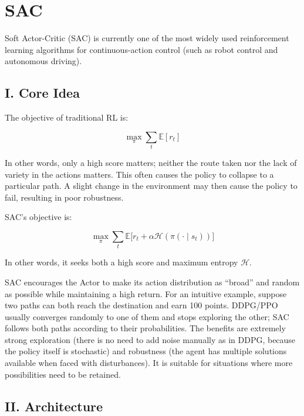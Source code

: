 \setcounter{section}{5}

\hypertarget{sac}{%
\section{SAC}\label{sac}}

Soft Actor-Critic (SAC) is currently one of the most widely used reinforcement learning algorithms for continuous-action control (such as robot control and autonomous driving).

\hypertarget{i.-core-idea-4}{%
\subsection{I. Core Idea}\label{i.-core-idea-4}}

The objective of traditional RL is:

\[
\max_\pi
\sum_t
\mathbb{E}[r_t]
\]

In other words, only a high score matters; neither the route taken nor the lack of variety in the actions matters. This often causes the policy to collapse to a particular path. A slight change in the environment may then cause the policy to fail, resulting in poor robustness.

SAC's objective is:

\[
\max_\pi
\sum_t
\mathbb{E}
\bigl[
r_t+\alpha\mathcal{H}(\pi(\cdot\mid s_t))
\bigr]
\]

In other words, it seeks both a high score and maximum entropy \(\mathcal{H}\).

SAC encourages the Actor to make its action distribution as ``broad'' and random as possible while maintaining a high return. For an intuitive example, suppose two paths can both reach the destination and earn 100 points. DDPG/PPO usually converges randomly to one of them and stops exploring the other; SAC follows both paths according to their probabilities. The benefits are extremely strong exploration (there is no need to add noise manually as in DDPG, because the policy itself is stochastic) and robustness (the agent has multiple solutions available when faced with disturbances). It is suitable for situations where more possibilities need to be retained.

\hypertarget{ii.-architecture}{%
\subsection{II. Architecture}\label{ii.-architecture}}

